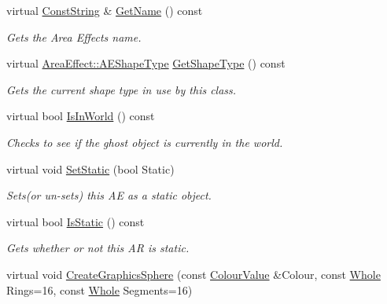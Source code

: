 \begin{DoxyCompactItemize}
virtual \hyperlink{namespacephys_a5ce5049f8b4bf88d6413c47b504ebb31}{ConstString} \& \hyperlink{classphys_1_1AreaEffect_ac61255fb998e6d76ba6678f70796174d}{GetName} () const 
\begin{DoxyCompactList}\small\item\em Gets the Area Effects name. \item\end{DoxyCompactList}\item 
virtual \hyperlink{classphys_1_1AreaEffect_a99b8746c43eac266d48ad613110dc6f9}{AreaEffect::AEShapeType} \hyperlink{classphys_1_1AreaEffect_a994162616c167a878dd5c0eff372bc06}{GetShapeType} () const 
\begin{DoxyCompactList}\small\item\em Gets the current shape type in use by this class. \item\end{DoxyCompactList}\item 
virtual bool \hyperlink{classphys_1_1AreaEffect_a2ef4bb9389dd9296e680a77058609712}{IsInWorld} () const 
\begin{DoxyCompactList}\small\item\em Checks to see if the ghost object is currently in the world. \item\end{DoxyCompactList}\item 
virtual void \hyperlink{classphys_1_1AreaEffect_acc55b82b29952902c3e9a3810decf3d9}{SetStatic} (bool Static)
\begin{DoxyCompactList}\small\item\em Sets(or un-\/sets) this AE as a static object. \item\end{DoxyCompactList}\item 
virtual bool \hyperlink{classphys_1_1AreaEffect_aecdf8cb72c6182e2495cf25c01afc249}{IsStatic} () const 
\begin{DoxyCompactList}\small\item\em Gets whether or not this AR is static. \item\end{DoxyCompactList}\item 
virtual void \hyperlink{classphys_1_1AreaEffect_a6d1e8ddcea39fa441f02010af1970a16}{CreateGraphicsSphere} (const \hyperlink{classphys_1_1ColourValue}{ColourValue} \&Colour, const \hyperlink{namespacephys_a460f6bc24c8dd347b05e0366ae34f34a}{Whole} Rings=16, const \hyperlink{namespacephys_a460f6bc24c8dd347b05e0366ae34f34a}{Whole} Segments=16)

\end{DoxyCompactItemize}
